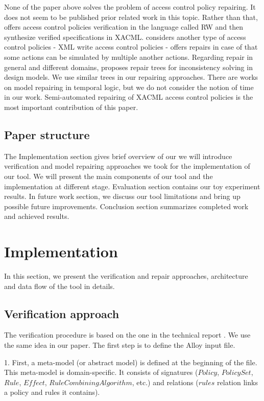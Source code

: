 \documentclass{acm_proc_article-sp}
\begin{document}
None of the paper above solves the problem of access control policy repairing. It does not seem to be published prior related work in this topic. Rather than that, \cite{Zhang:2004:SVA:1029133.1029141} offers access control policies verification in the language called RW and then synthesize verified specifications in XACML. \cite{Bravo:2007:RIX:1783534.1783545} considers another type of access control policies - XML write access control policies - offers repairs in case of that some actions can be simulated by multiple another actions. Regarding repair in general and different domains, \cite{Reder:2012:CRT:2351676.2351707} proposes repair trees for inconsistency solving in design models. We use similar trees in our repairing approaches. There are works on model repairing in temporal logic, but we do not consider the notion of time in our work. Semi-automated repairing of XACML access control policies is the most important contribution of this paper. 

\subsection{Paper structure}
The Implementation section gives brief overview of our we will introduce verification and model repairing approaches we took for the implementation of our tool. We will present the main components of our tool and the implementation at different stage. Evaluation section contains our toy experiment results. In future work section, we discuss our tool limitations and bring up possible future improvements. Conclusion section summarizes completed work and achieved results.

\section{Implementation}

In this section, we present the verification and repair approaches, architecture and data flow of the tool in details.

\subsection{Verification approach}

The verification procedure is based on the one in the technical report \cite{acp:alloy}. We use the same idea in our paper.
The first step is to define the Alloy input file.

1. First, a meta-model (or abstract model) is defined at the beginning of the file. This meta-model is domain-specific. It consists of signatures ($Policy$, $PolicySet$, $Rule$, $Effect$, $RuleCombiningAlgorithm$, etc.) and relations ($rules$ relation links a policy and rules it contains).
\end{document}
